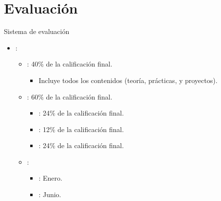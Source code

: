 \section{Evaluación}

\begin{frame}[t]{Sistema de evaluación}
\begin{itemize}
  \item {}:

  \begin{itemize}
    \item {}: 40\% de la calificación final.
      \begin{itemize}
        \item Incluye todos los contenidos (teoría, prácticas, y proyectos).
      \end{itemize}

    \item {}: 60\% de la calificación final.
      \begin{itemize}
        \item {}: 24\% de la calificación final.
        \item {}: 12\% de la calificación final.
        \item {}: 24\% de la calificación final.
      \end{itemize}
  \end{itemize}

  \begin{itemize}
    \item {}:
      \begin{itemize}
        \item {}: Enero.
        \item {}: Junio.
      \end{itemize}
  \end{itemize}
\end{itemize}
\end{frame}

